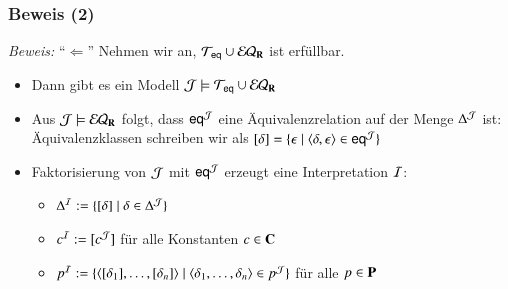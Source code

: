 \documentclass[aspectratio=1610,onlymath]{beamer}
\begin{document}
\begin{frame}[t]\frametitle{Beweis (2)}


\emph{Beweis:} "`$\Leftarrow$"' Nehmen wir an, $\mathcal{T}_{\textsf{eq}}\cup\mathcal{EQ}_{\textbf{\textcolor{black}{R}}}$ ist erfüllbar.\pause
\begin{itemize}
\item Dann gibt es ein Modell $\mathcal{J}\models\mathcal{T}_{\textsf{eq}}\cup\mathcal{EQ}_{\textbf{\textcolor{black}{R}}}$\pause
\item Aus $\mathcal{J}\models\mathcal{EQ}_{\textbf{\textcolor{black}{R}}}$ folgt, dass $\textsf{eq}^{\mathcal{J}}$ eine Äquivalenzrelation auf der Menge $\Delta^{\mathcal{J}}$ ist:\\
Äquivalenzklassen schreiben wir als $[\delta]=\{\epsilon\mid \langle{\delta,\epsilon}\rangle\in\textsf{eq}^{\mathcal{J}}\}$\pause
\item Faktorisierung von $\mathcal{J}$ mit $\textsf{eq}^{\mathcal{J}}$ erzeugt eine Interpretation $\mathcal{I}$:
	\begin{itemize}
	\item $\Delta^{\mathcal{I}}\mathrel{:=}\{[\delta]\mid \delta\in\Delta^{\mathcal{J}}\}$
	\item $c^{\mathcal{I}}\mathrel{:=}[c^{\mathcal{J}}]$ für alle Konstanten $c\in\textbf{\textcolor{black}{C}}$
	\item $p^{\mathcal{I}}\mathrel{:=}\{\langle{[\delta_1],\ldots,[\delta_n]}\rangle\mid \langle{\delta_1,\ldots,\delta_n}\rangle\in p^{\mathcal{J}}\}$ für alle $p\in\textbf{\textcolor{black}{P}}$ 
	\end{itemize}

\end{itemize}


\end{frame}
\end{document}

